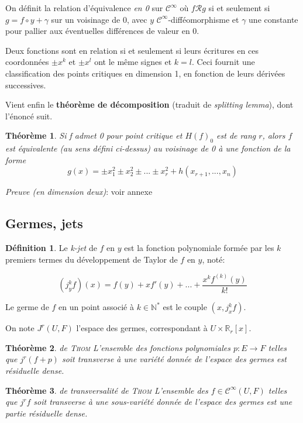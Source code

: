 \documentclass{article}
\newcommand{\cinf}{\mathcal{C}^\infty}
\newcommand{\R}{\mathbb{R}}
\newcommand{\N}{\mathbb{N}}
\newtheorem{thm}{Théorème}
\theoremstyle{definition}
\newtheorem{defn}{Définition}
\begin{document}
On définit la relation d'équivalence \textit{en 0} sur $\cinf$ où $f \mathcal{R} g$ si et seulement si $g=f\circ y + \gamma$ sur un voisinage de 0, avec $y$ $\cinf$-difféomorphisme et $\gamma$ une constante pour pallier aux éventuelles différences de valeur en 0.

Deux fonctions sont en relation si et seulement si leurs écritures en ces coordonnées $\pm x^k$ et $\pm x^l$ ont le même signes et $k=l$. Ceci fournit une classification des points critiques en dimension 1, en fonction de leurs dérivées successives.

Vient enfin le \textbf{théorème de décomposition} (traduit de \textit{splitting lemma}), dont l'énoncé suit.

\begin{thm}
Si f admet 0 pour point critique et $H(f)_0$ est de rang $r$, alors $f$ est équivalente (au sens défini ci-dessus) au voisinage de 0 à une fonction de la forme $$g(x)=\pm x_1^2\pm x_2^2\pm ... \pm x_r^2 + h(x_{r+1},...,x_n)$$
\end{thm}

\textit{Preuve (en dimension deux)}: voir annexe


\subsection{Germes, jets}

\begin{defn}
	Le \textit{k-jet} de $f$ en $y$ est la fonction polynomiale formée par les $k$ premiers termes du développement de Taylor de $f$ en $y$, noté:

	$$(j^k_y f)(x) = f(y) + xf'(y)+...+\frac{x^k f^{(k)}(y)}{k!}$$

	Le germe de $f$ en un point associé à $k\in\N^*$ est le couple $(x,j^k_x f)$.

	On note $J^r(U,F)$ l'espace des germes, correspondant à $U\times \R_r[x]$.
\end{defn}

\begin{thm}{de \textsc{Thom}}
	L'ensemble des fonctions polynomiales $p:E\to F$ telles que $j^r(f+p)$ soit transverse à une variété donnée de l'espace des germes est résiduelle dense.
\end{thm}

\begin{thm}{de transversalité de \textsc{Thom}}
	L'ensemble des $f\in\cinf(U,F)$ telles que $j^rf$ soit transverse à une sous-variété donnée de l'espace des germes est une partie résiduelle dense.
\end{thm}
\end{document}
